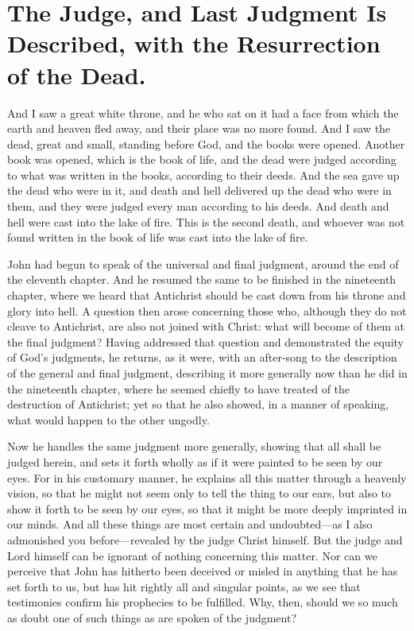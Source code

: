 \chapter[Sermon 90. The Judge, and Last Judgment Is Described, with the Resurrection of the Dead.]{The Judge, and Last Judgment Is Described, with the Resurrection of the Dead.}
\label{sermon:090}

And I saw a great white throne, and he who sat on it had a face from which the earth and heaven fled away, and their place was no more found. And I saw the dead, great and small, standing before God, and the books were opened. Another book was opened, which is the book of life, and the dead were judged according to what was written in the books, according to their deeds. And the sea gave up the dead who were in it, and death and hell delivered up the dead who were in them, and they were judged every man according to his deeds. And death and hell were cast into the lake of fire. This is the second death, and whoever was not found written in the book of life was cast into the lake of fire.

John had begun to speak of the universal and final judgment, around the end of the eleventh chapter. And he resumed the same to be finished in the nineteenth chapter, where we heard that Antichrist should be cast down from his throne and glory into hell. A question then arose concerning those who, although they do not cleave to Antichrist, are also not joined with Christ: what will become of them at the final judgment? Having addressed that question and demonstrated the equity of God’s judgments, he returns, as it were, with an after-song to the description of the general and final judgment, describing it more generally now than he did in the nineteenth chapter, where he seemed chiefly to have treated of the destruction of Antichrist; yet so that he also showed, in a manner of speaking, what would happen to the other ungodly.

Now he handles the same judgment more generally, showing that all shall be judged herein, and sets it forth wholly as if it were painted to be seen by our eyes. For in his customary manner, he explains all this matter through a heavenly vision, so that he might not seem only to tell the thing to our ears, but also to show it forth to be seen by our eyes, so that it might be more deeply imprinted in our minds. And all these things are most certain and undoubted—as I also admonished you before—revealed by the judge Christ himself. But the judge and Lord himself can be ignorant of nothing concerning this matter. Nor can we perceive that John has hitherto been deceived or misled in anything that he has set forth to us, but has hit rightly all and singular points, as we see that testimonies confirm his prophecies to be fulfilled. Why, then, should we so much as doubt one of such things as are spoken of the judgment?

